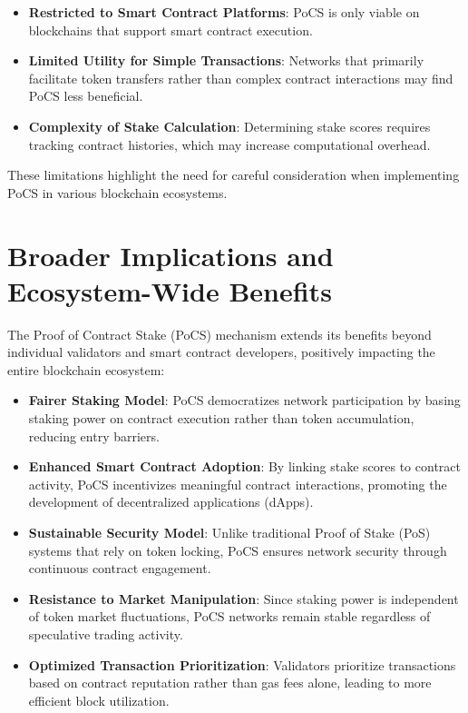 \documentclass{article}
\begin{document}
\begin{itemize}
    \item \textbf{Restricted to Smart Contract Platforms}: PoCS is only viable on blockchains that support smart contract execution.
    \item \textbf{Limited Utility for Simple Transactions}: Networks that primarily facilitate token transfers rather than complex contract interactions may find PoCS less beneficial.
    \item \textbf{Complexity of Stake Calculation}: Determining stake scores requires tracking contract histories, which may increase computational overhead.
\end{itemize}

These limitations highlight the need for careful consideration when implementing PoCS in various blockchain ecosystems.

\section{Broader Implications and Ecosystem-Wide Benefits}

The Proof of Contract Stake (PoCS) mechanism extends its benefits beyond individual validators and smart contract developers, positively impacting the entire blockchain ecosystem:

\begin{itemize}
    \item \textbf{Fairer Staking Model}: PoCS democratizes network participation by basing staking power on contract execution rather than token accumulation, reducing entry barriers.
    \item \textbf{Enhanced Smart Contract Adoption}: By linking stake scores to contract activity, PoCS incentivizes meaningful contract interactions, promoting the development of decentralized applications (dApps).
    \item \textbf{Sustainable Security Model}: Unlike traditional Proof of Stake (PoS) systems that rely on token locking, PoCS ensures network security through continuous contract engagement.
    \item \textbf{Resistance to Market Manipulation}: Since staking power is independent of token market fluctuations, PoCS networks remain stable regardless of speculative trading activity.
    \item \textbf{Optimized Transaction Prioritization}: Validators prioritize transactions based on contract reputation rather than gas fees alone, leading to more efficient block utilization.
\end{itemize}
\end{document}
